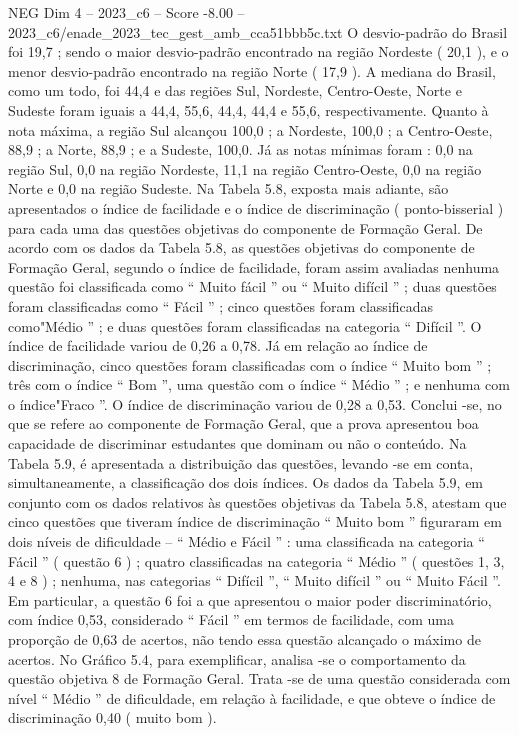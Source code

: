\begin{textsample}{NEG Dim 4 – 2023\_c6 – Score -8.00 – 2023\_c6/enade\_2023\_tec\_gest\_amb\_cca51bbb5c.txt}
O desvio-padrão do Brasil foi 19,7 ; sendo o maior desvio-padrão encontrado na região Nordeste ( 20,1 ), e o menor desvio-padrão encontrado na região Norte ( 17,9 ).
A mediana do Brasil, como um todo, foi 44,4 e das regiões Sul, Nordeste, Centro-Oeste, Norte e Sudeste foram iguais a 44,4, 55,6, 44,4, 44,4 e 55,6, respectivamente.
Quanto à nota máxima, a região Sul alcançou 100,0 ; a Nordeste, 100,0 ; a Centro-Oeste, 88,9 ; a Norte, 88,9 ; e a Sudeste, 100,0.
Já as notas mínimas foram : 0,0 na região Sul, 0,0 na região Nordeste, 11,1 na região Centro-Oeste, 0,0 na região Norte e 0,0 na região Sudeste.
Na Tabela 5.8, exposta mais adiante, são apresentados o índice de facilidade e o índice de discriminação ( ponto-bisserial ) para cada uma das questões objetivas do componente de Formação Geral.
De acordo com os dados da Tabela 5.8, as questões objetivas do componente de Formação Geral, segundo o índice de facilidade, foram assim avaliadas nenhuma questão foi classificada como “ Muito fácil ” ou “ Muito difícil ” ; duas questões foram classificadas como “ Fácil ” ; cinco questões foram classificadas como"Médio ” ; e duas questões foram classificadas na categoria “ Difícil ”.
O índice de facilidade variou de 0,26 a 0,78.
Já em relação ao índice de discriminação, cinco questões foram classificadas com o índice “ Muito bom ” ; três com o índice “ Bom ”, uma questão com o índice “ Médio ” ; e nenhuma com o índice"Fraco ”.
O índice de discriminação variou de 0,28 a 0,53.
Conclui -se, no que se refere ao componente de Formação Geral, que a prova apresentou boa capacidade de discriminar estudantes que dominam ou não o conteúdo.
Na Tabela 5.9, é apresentada a distribuição das questões, levando -se em conta, simultaneamente, a classificação dos dois índices.
Os dados da Tabela 5.9, em conjunto com os dados relativos às questões objetivas da Tabela 5.8, atestam que cinco questões que tiveram índice de discriminação “ Muito bom ” figuraram em dois níveis de dificuldade – “ Médio e Fácil ” : uma classificada na categoria “ Fácil ” ( questão 6 ) ; quatro classificadas na categoria “ Médio ” ( questões 1, 3, 4 e 8 ) ; nenhuma, nas categorias “ Difícil ”, “ Muito difícil ” ou “ Muito Fácil ”.
Em particular, a questão 6 foi a que apresentou o maior poder discriminatório, com índice 0,53, considerado “ Fácil ” em termos de facilidade, com uma proporção de 0,63 de acertos, não tendo essa questão alcançado o máximo de acertos.
No Gráfico 5.4, para exemplificar, analisa -se o comportamento da questão objetiva 8 de Formação Geral.
Trata -se de uma questão considerada com nível “ Médio ” de dificuldade, em relação à facilidade, e que obteve o índice de discriminação 0,40 ( muito bom ).

\end{textsample}
